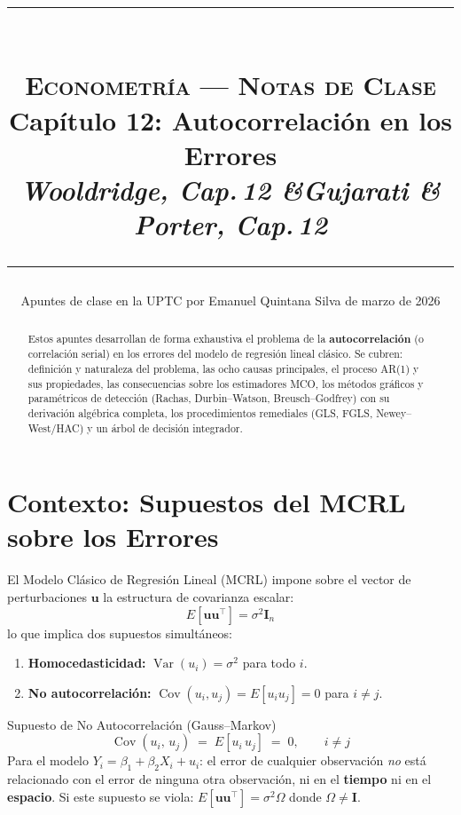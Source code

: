 \documentclass[11pt, letterpaper]{article}
\title{%
  \rule{\linewidth}{1.4pt}\\[6pt]
  {\Large\bfseries\scshape Econometr\'ia --- Notas de Clase}\\[4pt]
  {\large Cap\'itulo 12: Autocorrelaci\'on en los Errores}\\[3pt]
  {\normalsize\textit{Wooldridge, Cap.\,12 \quad\&\quad Gujarati \& Porter, Cap.\,12}}\\[6pt]
  \rule{\linewidth}{0.6pt}
}
\author{\normalsize Apuntes de clase en la UPTC por Emanuel Quintana Silva \quad\textperiodcentered\quad 17 de marzo de 2026}
\date{}
\begin{document}
\maketitle
\thispagestyle{fancy}

\begin{abstract}
\noindent
Estos apuntes desarrollan de forma exhaustiva el problema de la
\textbf{autocorrelaci\'on} (o correlaci\'on serial) en los errores del modelo de
regresi\'on lineal cl\'asico. Se cubren: definici\'on y naturaleza del problema,
las ocho causas principales, el proceso AR(1) y sus propiedades, las
consecuencias sobre los estimadores MCO, los m\'etodos gr\'aficos y param\'etricos
de detecci\'on (Rachas, Durbin--Watson, Breusch--Godfrey) con su derivaci\'on
alg\'ebrica completa, los procedimientos remediales (GLS, FGLS, Newey--West/HAC)
y un \'arbol de decisi\'on integrador.
\end{abstract}

\newpage

\tableofcontents

\newpage

\section{Contexto: Supuestos del MCRL sobre los Errores}

El Modelo Cl\'asico de Regresi\'on Lineal (MCRL) impone sobre el vector de
perturbaciones $\mathbf{u}$ la estructura de covarianza escalar:
\[
  E[\mathbf{u}\mathbf{u}^\top] = \sigma^2 \mathbf{I}_n
\]
lo que implica dos supuestos simult\'aneos:
\begin{enumerate}
  \item \textbf{Homocedasticidad:} $\operatorname{Var}(u_i) = \sigma^2$ para todo $i$.
  \item \textbf{No autocorrelaci\'on:}
    $\operatorname{Cov}(u_i, u_j) = E[u_i u_j] = 0$ para $i \neq j$.
\end{enumerate}

\begin{definicion}{Supuesto de No Autocorrelaci\'on (Gauss--Markov)}
\[
  \operatorname{Cov}(u_i,\, u_j) \;=\; E\!\left[u_i\, u_j\right] \;=\; 0,
  \qquad i \neq j
\]
Para el modelo $Y_i = \beta_1 + \beta_2 X_i + u_i$: el error de cualquier
observaci\'on \emph{no} est\'a relacionado con el error de ninguna otra
observaci\'on, ni en el \textbf{tiempo} ni en el \textbf{espacio}.
Si este supuesto se viola: $E[\mathbf{u}\mathbf{u}^\top] = \sigma^2\Omega$
donde $\Omega \neq \mathbf{I}$.
\end{definicion}
\end{document}
